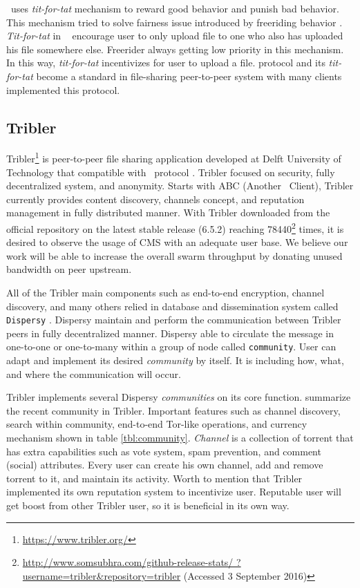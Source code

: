 \bt~uses \textit{tit-for-tat} mechanism to reward good behavior and punish bad behavior. This mechanism tried to solve fairness issue introduced by freeriding behavior \cite{2003:bittorrent:cohen}. \textit{Tit-for-tat} in \bt~ encourage user to only upload file to one who also has uploaded his file somewhere else. Freerider always getting low priority in this mechanism. In this way, \textit{tit-for-tat} incentivizes for user to upload a file. \bt protocol and its \textit{tit-for-tat} become a standard in file-sharing peer-to-peer system with many clients implemented this protocol.

\subsection{Tribler}
Tribler\footnote{\url{https://www.tribler.org/}} is peer-to-peer file sharing application developed at Delft University of Technology that compatible with \bt~protocol \cite{2008:tribler:pouwelse}. Tribler focused on security, fully decentralized system, and anonymity. Starts with ABC (Another \bt~Client), Tribler currently provides content discovery, channels concept, and reputation management in fully distributed manner. With Tribler downloaded from the official repository on the latest stable release (6.5.2) reaching  78440\footnote{\url{http://www.somsubhra.com/github-release-stats/ ?username=tribler&repository=tribler} (Accessed 3 September 2016)} times, it is desired to observe the usage of CMS with an adequate user base. We believe our work will be able to increase the overall swarm throughput by donating unused bandwidth on peer upstream.

All of the Tribler main components such as end-to-end encryption, channel discovery, and many others relied in database and dissemination system called \texttt{Dispersy} \cite{2013:dispersy:zeilemaker}. Dispersy maintain and perform the communication between Tribler peers in fully decentralized manner. Dispersy able to circulate the message in one-to-one or one-to-many within a group of node called \texttt{community}. User can adapt and implement its desired \textit{community} by itself. It is including how, what, and where the communication will occur.

Tribler implements several Dispersy \textit{communities} on its core function. \citeauthor{2016:tribler-techdebt:vos} summarize the recent community in Tribler. Important features such as channel discovery, search within community, end-to-end Tor-like operations, and currency mechanism shown in table \ref{tbl:community}. \textit{Channel} is a collection of torrent that has extra capabilities such as vote system, spam prevention, and comment (social) attributes. Every user can create his own channel, add and remove torrent to it, and maintain its activity. Worth to mention that Tribler implemented its own reputation system to incentivize user. Reputable user will get boost from other Tribler user, so it is beneficial in its own way.

